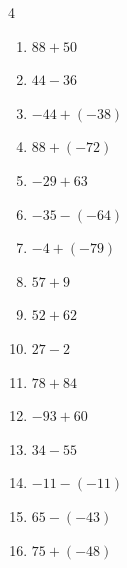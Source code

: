 \begin{multicols}{4}
\begin{enumerate}
        \phantom{$=61$}

  \item $88+50$

        \phantom{$=138$}

  \item $44-36$

        \phantom{$=8$}

  \item $-44+(-38)$

        \phantom{$=-82$}

  \item $88+(-72)$

        \phantom{$=16$}

  \item $-29+63$

        \phantom{$=34$}

  \item $-35-(-64)$

        \phantom{$=29$}

  \item $-4+(-79)$

        \phantom{$=-83$}

  \item $57+9$

        \phantom{$=66$}

  \item $52+62$

        \phantom{$=114$}

  \item $27-2$

        \phantom{$=25$}

  \item $78+84$

        \phantom{$=162$}

  \item $-93+60$

        \phantom{$=-33$}

  \item $34-55$

        \phantom{$=-21$}

  \item $-11-(-11)$

        \phantom{$=0$}

  \item $65-(-43)$

        \phantom{$=108$}

\columnbreak %

  \item $75+(-48)$


\end{enumerate}
\end{multicols}
